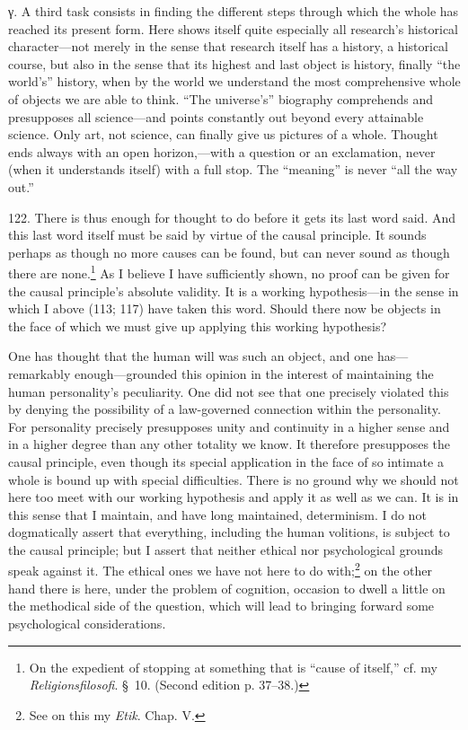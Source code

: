 \documentclass[12pt,a4paper]{book}
\newcommand{\opage}[1]{\marginnote{\footnotesize\textit{[#1]}}}
\begin{document}
γ. A third task consists in finding the different steps through which the whole has
reached its present form. Here shows itself quite especially all research's
historical character---not merely in the sense that research itself has a history, a
historical course, but also in the sense that its highest and last object is
history, finally ``the world's'' history, when by the world we understand the most
comprehensive whole of objects we are able to think. ``The universe's'' biography
comprehends and presupposes all science---and points constantly out beyond every
attainable science. Only art, not science, can finally give us pictures of a whole.
Thought ends always with an open horizon,---with a question or an exclamation, never
(when it understands itself) with a full stop. The ``meaning'' is never ``all the
way out.''

122. There is thus enough for thought to do before it gets its last word said. And
this last word itself must be said by virtue of the causal principle. It sounds
perhaps as though no more causes can be found, but can never sound as though there
are none.\footnote{On the expedient of stopping at something that is ``cause of
itself,'' cf. my \emph{Religionsfilosofi}. \S\ 10. (Second edition p. 37--38.)} As
I believe I have sufficiently shown, no proof can be given for the causal
principle's \opage{291}absolute validity. It is a working hypothesis---in the sense in which I
above (113; 117) have taken this word. Should there now be objects in the face of
which we must give up applying this working hypothesis?

One has thought that the human will was such an object, and one has---remarkably
enough---grounded this opinion in the interest of maintaining the human
personality's peculiarity. One did not see that one precisely violated this by
denying the possibility of a law-governed connection within the personality. For
personality precisely presupposes unity and continuity in a higher sense and in a
higher degree than any other totality we know. It therefore presupposes the causal
principle, even though its special application in the face of so intimate a whole is
bound up with special difficulties. There is no ground why we should not here too
meet with our working hypothesis and apply it as well as we can. It is in this sense
that I maintain, and have long maintained, determinism. I do not dogmatically assert
that everything, including the human volitions, is subject to the causal principle;
but I assert that neither ethical nor psychological grounds speak against it. The
ethical ones we have not here to do with;\footnote{See on this my \emph{Etik}. Chap.
V.} on the other hand there is here, under the problem of cognition, occasion to
dwell a little on the methodical side of the question, which will lead to bringing
forward some psychological considerations.
\end{document}
